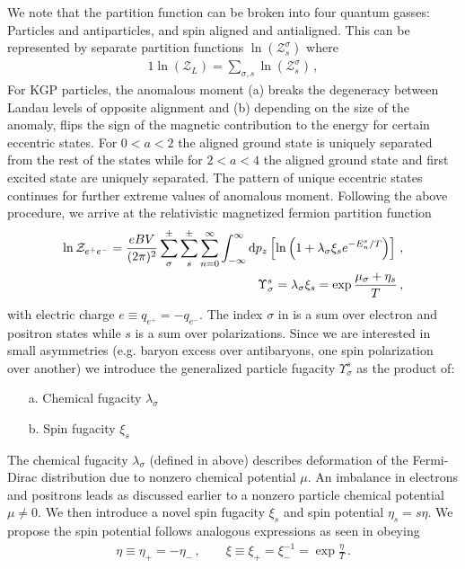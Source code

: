 We note that the partition function can be broken into four quantum gasses: Particles and antiparticles, and spin aligned and antialigned. This can be represented by separate partition functions $\ln\left(\mathcal{Z}^{\sigma}_{s}\right)$ where
\begin{alignat}{1}
    \label{FourGasses} \ln\left(\mathcal{Z}_{L}\right)=\sum_{\sigma,s}\ln\left(\mathcal{Z}^{\sigma}_{s}\right)\,,
\end{alignat}
For KGP particles, the anomalous moment (a) breaks the degeneracy between Landau levels of opposite alignment and (b) depending on the size of the anomaly, flips the sign of the magnetic contribution to the energy for certain eccentric states. For $0<a<2$ the aligned ground state is uniquely separated from the rest of the states while for $2<a<4$ the aligned ground state and first excited state are uniquely separated. The pattern of unique eccentric states continues for further extreme values of anomalous moment. Following the above procedure, we arrive at the relativistic magnetized fermion partition function
\begin{align}
 \label{partition}
 \ln{\cal Z}_{e^{+}e^{-}}=\frac{eBV}{(2\pi)^{2}}\sum_{\sigma}^{\pm}\sum_{s}^{\pm}\sum_{n=0}^{\infty}\int_{-\infty}^{\infty}{\rm d}p_{z}
 \left[\ln\left(1+\lambda_{\sigma}\xi_{s}e^{-E_{n}^{s}/T}\right)\right]\,,\\
 \Upsilon_{\sigma}^{s}=\lambda_{\sigma}\xi_{s} = \exp{\frac{\mu_{\sigma}+\eta_{s}}{T}}\,,
\end{align}
with electric charge $e\equiv q_{e^{+}}=-q_{e^{-}}$. The index $\sigma$ in  is a sum over electron and positron states while $s$ is a sum over polarizations. Since we are interested in small asymmetries (e.g. baryon excess over antibaryons, one spin polarization over another) we introduce the generalized particle fugacity $\Upsilon_{\sigma}^{s}$ as the product of:
\begin{itemize}[nosep]
 \item[a.] Chemical fugacity $\lambda_{\sigma}$
 \item[b.] Spin fugacity $\xi_{s}$
\end{itemize}
The chemical fugacity $\lambda_{\sigma}$ (defined in  above) describes deformation of the Fermi-Dirac distribution due to nonzero chemical potential $\mu$. An imbalance in electrons and positrons leads as discussed earlier to a nonzero particle chemical potential $\mu\neq0$. We then introduce a novel spin fugacity $\xi_{s}$ and spin potential $\eta_{s}=s\eta$. We propose the spin potential follows analogous expressions as seen in  obeying
\begin{align}
 \label{spotential}
 \eta\equiv\eta_{+}=-\eta_{-}\,,\qquad
 \xi\equiv\xi_{+}=\xi_{-}^{-1}= \exp{\frac{\eta}{T}}\,.
\end{align}

